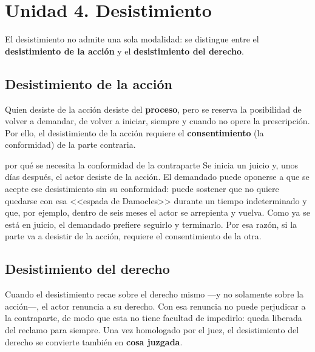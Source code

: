 \documentclass[12pt,oneside]{book}
\begin{document}
\section{Unidad 4. Desistimiento}

El desistimiento no admite una sola modalidad: se distingue entre el \textbf{desistimiento de la acción} y el \textbf{desistimiento del derecho}.

\subsection{Desistimiento de la acción}

Quien desiste de la acción desiste del \textbf{proceso}, pero se reserva la posibilidad de volver a demandar, de volver a iniciar, siempre y cuando no opere la prescripción. Por ello, el desistimiento de la acción requiere el \textbf{consentimiento} (la conformidad) de la parte contraria.

\begin{example}{por qué se necesita la conformidad de la contraparte}
Se inicia un juicio y, unos días después, el actor desiste de la acción. El demandado puede oponerse a que se acepte ese desistimiento sin su conformidad: puede sostener que no quiere quedarse con esa <<espada de Damocles>> durante un tiempo indeterminado y que, por ejemplo, dentro de seis meses el actor se arrepienta y vuelva. Como ya se está en juicio, el demandado prefiere seguirlo y terminarlo. Por esa razón, si la parte va a desistir de la acción, requiere el consentimiento de la otra.
\end{example}

\subsection{Desistimiento del derecho}

Cuando el desistimiento recae sobre el derecho mismo ---y no solamente sobre la acción---, el actor renuncia a su derecho. Con esa renuncia no puede perjudicar a la contraparte, de modo que esta no tiene facultad de impedirlo: queda liberada del reclamo para siempre. Una vez homologado por el juez, el desistimiento del derecho se convierte también en \textbf{cosa juzgada}.
\end{document}
